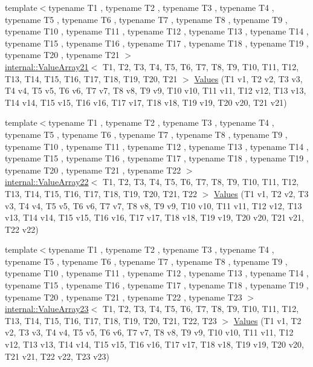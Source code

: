 \begin{DoxyCompactItemize}
\item 
{\footnotesize template$<$typename T1 , typename T2 , typename T3 , typename T4 , typename T5 , typename T6 , typename T7 , typename T8 , typename T9 , typename T10 , typename T11 , typename T12 , typename T13 , typename T14 , typename T15 , typename T16 , typename T17 , typename T18 , typename T19 , typename T20 , typename T21 $>$ }\\\mbox{\hyperlink{classtesting_1_1internal_1_1_value_array21}{internal\+::\+Value\+Array21}}$<$ T1, T2, T3, T4, T5, T6, T7, T8, T9, T10, T11, T12, T13, T14, T15, T16, T17, T18, T19, T20, T21 $>$ \mbox{\hyperlink{namespacetesting_a6f3b9661b48f2c663dbe5fcfb0720f5f}{Values}} (T1 v1, T2 v2, T3 v3, T4 v4, T5 v5, T6 v6, T7 v7, T8 v8, T9 v9, T10 v10, T11 v11, T12 v12, T13 v13, T14 v14, T15 v15, T16 v16, T17 v17, T18 v18, T19 v19, T20 v20, T21 v21)
\item 
{\footnotesize template$<$typename T1 , typename T2 , typename T3 , typename T4 , typename T5 , typename T6 , typename T7 , typename T8 , typename T9 , typename T10 , typename T11 , typename T12 , typename T13 , typename T14 , typename T15 , typename T16 , typename T17 , typename T18 , typename T19 , typename T20 , typename T21 , typename T22 $>$ }\\\mbox{\hyperlink{classtesting_1_1internal_1_1_value_array22}{internal\+::\+Value\+Array22}}$<$ T1, T2, T3, T4, T5, T6, T7, T8, T9, T10, T11, T12, T13, T14, T15, T16, T17, T18, T19, T20, T21, T22 $>$ \mbox{\hyperlink{namespacetesting_aadfff0d803156b98ff1ffa5f1d95c350}{Values}} (T1 v1, T2 v2, T3 v3, T4 v4, T5 v5, T6 v6, T7 v7, T8 v8, T9 v9, T10 v10, T11 v11, T12 v12, T13 v13, T14 v14, T15 v15, T16 v16, T17 v17, T18 v18, T19 v19, T20 v20, T21 v21, T22 v22)
\item 
{\footnotesize template$<$typename T1 , typename T2 , typename T3 , typename T4 , typename T5 , typename T6 , typename T7 , typename T8 , typename T9 , typename T10 , typename T11 , typename T12 , typename T13 , typename T14 , typename T15 , typename T16 , typename T17 , typename T18 , typename T19 , typename T20 , typename T21 , typename T22 , typename T23 $>$ }\\\mbox{\hyperlink{classtesting_1_1internal_1_1_value_array23}{internal\+::\+Value\+Array23}}$<$ T1, T2, T3, T4, T5, T6, T7, T8, T9, T10, T11, T12, T13, T14, T15, T16, T17, T18, T19, T20, T21, T22, T23 $>$ \mbox{\hyperlink{namespacetesting_a820991f1c28518a0c218176bd7192de8}{Values}} (T1 v1, T2 v2, T3 v3, T4 v4, T5 v5, T6 v6, T7 v7, T8 v8, T9 v9, T10 v10, T11 v11, T12 v12, T13 v13, T14 v14, T15 v15, T16 v16, T17 v17, T18 v18, T19 v19, T20 v20, T21 v21, T22 v22, T23 v23)

\end{DoxyCompactItemize}
